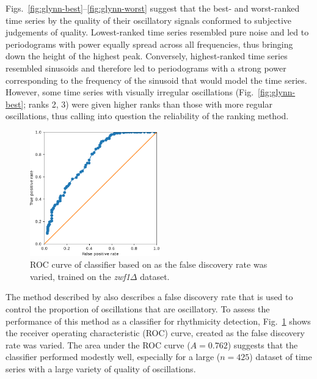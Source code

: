 Figs.\ \ref{fig:glynn-best}--\ref{fig:glynn-worst} suggest that the best- and worst-ranked time series by the quality of their oscillatory signals conformed to subjective judgements of quality.
Lowest-ranked time series resembled pure noise and led to periodograms with power equally spread across all frequencies, thus bringing down the height of the highest peak.
Conversely, highest-ranked time series resembled sinusoids and therefore led to periodograms with a strong power corresponding to the frequency of the sinusoid that would model the time series.
However, some time series with visually irregular oscillations (Fig.\ \ref{fig:glynn-best}; ranks 2, 3) were given higher ranks than those with more regular oscillations, thus calling into question the reliability of the ranking method.

\begin{figure}
  \centering
  \includegraphics[width=0.5\textwidth]{glynn_is20016_5_edit.pdf}
  \caption[
    ROC curve of classifier based on \textcite{glynnDetectingPeriodicPatterns2006a} as the false discovery rate was varied, trained on the \textit{zwf1$\Delta$} dataset.
  ]{
    ROC curve of classifier based on \textcite{glynnDetectingPeriodicPatterns2006a} as the false discovery rate was varied, trained on the \textit{zwf1$\Delta$} dataset.
  }
  \label{fig:glynn-roc}
\end{figure}

The method described by \textcite{glynnDetectingPeriodicPatterns2006a} also describes a false discovery rate that is used to control the proportion of oscillations that are oscillatory.
To assess the performance of this method as a classifier for rhythmicity detection, Fig.\ \ref{fig:glynn-roc} shows the receiver operating characteristic (ROC) curve, created as the false discovery rate was varied.
The area under the ROC curve ($A = 0.762$) suggests that the classifier performed modestly well, especially for a large ($n=425$) dataset of time series with a large variety of quality of oscillations.


